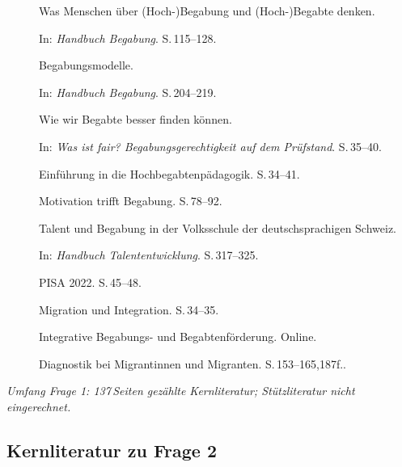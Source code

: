\begin{description}
  \item[\cite{baudson2021wasdenken}] Was Menschen über (Hoch-)Begabung und (Hoch-)Begabte denken.
    
    In: \textit{Handbuch Begabung}.
    S.\,115--128.

  \item[\cite{muelleroppliger2021begabungsmodelle}] Begabungsmodelle.
    
    In: \textit{Handbuch Begabung}.
    S.\,204--219.

  \item[\cite{baudson2025besserfinden}] Wie wir Begabte besser finden können.
    
    In: \textit{Was ist fair? Begabungsgerechtigkeit auf dem Prüfstand}.
    S.\,35--40.

  \item[\cite{trautmann2016einfuehrung}] Einführung in die Hochbegabtenpädagogik.
    S.\,34--41.

  \item[\cite{lehwald2017motivation}] Motivation trifft Begabung.
    S.\,78--92.

  \item[\cite{grossenbacher2014integrative}] Talent und Begabung in der Volksschule der deutschsprachigen Schweiz.
    
    In: \textit{Handbuch Talententwicklung}.
    S.\,317--325.

  \item[\cite{erzinger2023pisa}] PISA 2022.
    S.\,45--48.

  \item[\cite{bfs2022migration}] Migration und Integration.
    S.\,34--35.

  \item[\cite{dvs2025bbf}] Integrative Begabungs- und Begabtenförderung.
    Online.

  \item[\cite{maehler2018diagnostik}] Diagnostik bei Migrantinnen und Migranten.
    S.\,153--165,187f..

\end{description}

\textit{Umfang Frage 1: 137\,Seiten gezählte Kernliteratur; Stützliteratur nicht eingerechnet.}


\subsection{Kernliteratur zu Frage 2}


